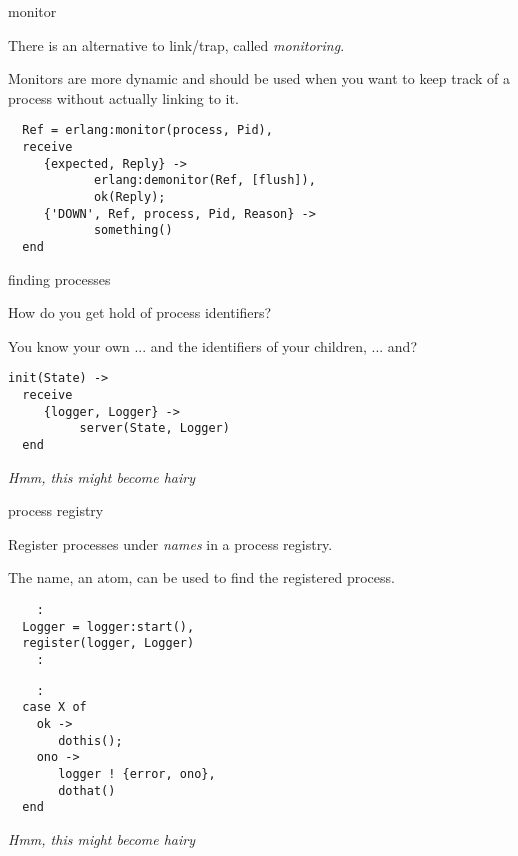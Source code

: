 \begin{frame}[fragile]{monitor}

There is an alternative to link/trap, called {\em monitoring}.

\pause\vspace{10pt}
Monitors are more dynamic and should be used when you want to keep
track of a process without actually linking to it.
\pause\vspace{10pt}

\begin{verbatim}
  Ref = erlang:monitor(process, Pid),
  receive 
     {expected, Reply} ->
            erlang:demonitor(Ref, [flush]),
            ok(Reply);
     {'DOWN', Ref, process, Pid, Reason} ->
            something()
  end
\end{verbatim}

\end{frame}

\begin{frame}[fragile]{finding processes}

How do you get hold of process identifiers?

\pause\vspace{10pt}
You know your own ... and the identifiers of your children, ... and?

\pause\vspace{10pt}
\begin{verbatim}
init(State) ->
  receive 
     {logger, Logger} ->
          server(State, Logger)
  end
\end{verbatim}

\pause\vspace{10pt}
{\em Hmm, this might become hairy}

\end{frame}

\begin{frame}[fragile]{process registry}

Register processes under {\em names} in a process registry.

\pause\vspace{10pt}
The name, an atom, can be used to find the registered process.

\pause\vspace{10pt}
\begin{verbatim}
    :
  Logger = logger:start(),
  register(logger, Logger)
    :
\end{verbatim}

\pause\vspace{10pt}
\begin{verbatim}
    :
  case X of
    ok -> 
       dothis();
    ono -> 
       logger ! {error, ono},
       dothat()
  end
\end{verbatim}

\pause\vspace{10pt}
{\em Hmm, this might become hairy}

\end{frame}


